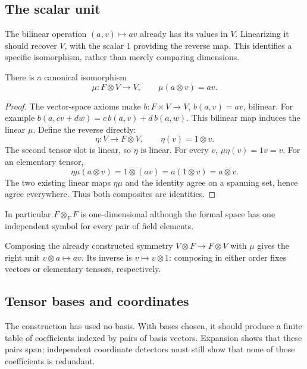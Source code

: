 \subsection{The scalar unit}

The bilinear operation $(a,v)\mapsto av$ already has its values in $V$.
Linearizing it should recover $V$, with the scalar $1$ providing the
reverse map. This identifies a specific isomorphism, rather than merely
comparing dimensions.

\begin{proposition}\label{prop:tensor-unit}
There is a canonical isomorphism
\[
\mu:F\otimes V\longrightarrow V,\qquad \mu(a\otimes v)=av.
\]
\end{proposition}
\begin{proof}
The vector-space axioms make $b:F\times V\to V$, $b(a,v)=av$,
bilinear. For example $b(a,cv+dw)=c\,b(a,v)+d\,b(a,w)$.
This bilinear map induces the linear $\mu$. Define the reverse directly:
\[
\eta:V\longrightarrow F\otimes V,\qquad \eta(v)=1\otimes v.
\]
The second tensor slot
is linear, so $\eta$ is linear. For every $v$, $\mu\eta(v)=1v=v$.
For an elementary tensor,
\[
\eta\mu(a\otimes v)=1\otimes(av)=a(1\otimes v)=a\otimes v.
\]
The two existing linear maps $\eta\mu$ and the identity agree on a
spanning set, hence agree everywhere. Thus both composites are identities.
\end{proof}
In particular $F\otimes_F F$ is one-dimensional although the formal
space has one independent symbol for every pair of field elements.

Composing the already constructed symmetry $V\otimes F\to F\otimes V$
with $\mu$ gives the right unit $v\otimes a\mapsto av$.
Its inverse is $v\mapsto v\otimes1$: composing in either order fixes
vectors or elementary tensors, respectively.

\subsection{Tensor bases and coordinates}

The construction has used no basis. With bases chosen, it should produce
a finite table of coefficients indexed by pairs of basis vectors. Expansion
shows that these pairs span; independent coordinate detectors must still
show that none of those coefficients is redundant.


